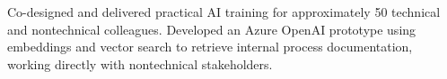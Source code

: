 Co-designed and delivered practical AI training for approximately 50 technical and nontechnical colleagues. Developed an Azure OpenAI prototype using embeddings and vector search to retrieve internal process documentation, working directly with nontechnical stakeholders.

